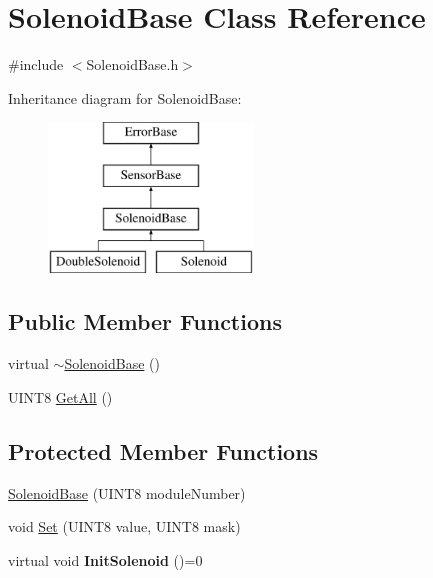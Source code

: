 \hypertarget{classSolenoidBase}{
\section{SolenoidBase Class Reference}
\label{classSolenoidBase}
}


{\ttfamily \#include $<$SolenoidBase.h$>$}

Inheritance diagram for SolenoidBase:\begin{figure}[H]
\begin{center}
\leavevmode
\includegraphics[height=4.000000cm]{classSolenoidBase}
\end{center}
\end{figure}
\subsection*{Public Member Functions}
\begin{DoxyCompactItemize}
\item 
virtual \hyperlink{classSolenoidBase_aa3ff4e46bc52588243bfb6ea511864fa}{$\sim$SolenoidBase} ()
\item 
UINT8 \hyperlink{classSolenoidBase_ac0d9d4d811fce90140eef64f41cecdd5}{GetAll} ()
\end{DoxyCompactItemize}
\subsection*{Protected Member Functions}
\begin{DoxyCompactItemize}
\item 
\hyperlink{classSolenoidBase_ae623dcc8b967d5a1f23f58f2f23317ae}{SolenoidBase} (UINT8 moduleNumber)
\item 
void \hyperlink{classSolenoidBase_a7aa6f30b9b7337867667f24fec115058}{Set} (UINT8 value, UINT8 mask)
\item 
\hypertarget{classSolenoidBase_a7ca79c91469bd82dc13163c3c7144d5e}{
virtual void {\bfseries InitSolenoid} ()=0}
\label{classSolenoidBase_a7ca79c91469bd82dc13163c3c7144d5e}

\end{DoxyCompactItemize}
